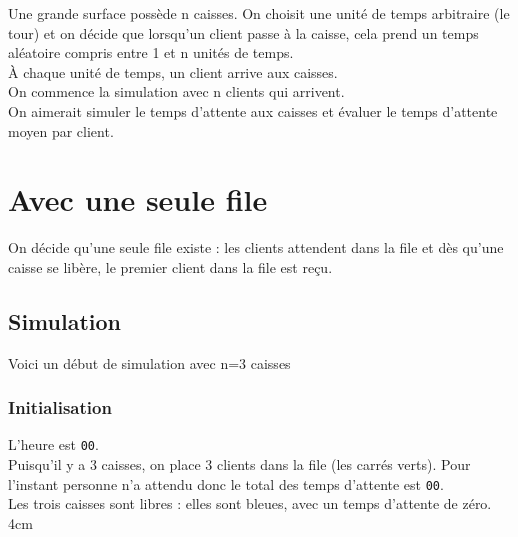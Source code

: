 \documentclass[a4paper,12pt,french]{book}
\begin{document}



Une grande surface possède n caisses. On choisit une unité de temps arbitraire (le tour) et on décide que lorsqu'un client passe à la caisse, cela prend un temps aléatoire compris entre 1 et n unités de temps.\\
À chaque unité de temps, un client arrive aux caisses.\\
On commence la simulation avec n clients qui arrivent.\\
On aimerait simuler le temps d'attente aux caisses et évaluer le temps d'attente moyen par client.\\


\section*{Avec une seule file}

On décide qu'une seule file existe : les clients attendent dans la file et dès qu'une caisse se libère, le premier client dans la file est reçu.

\subsection*{Simulation}
 Voici un début de simulation avec n=3 caisses
\subsubsection*{Initialisation}
\double
{
L'heure est \texttt{00}.\\
Puisqu'il y a 3 caisses, on place 3 clients dans la file (les carrés verts).
Pour l'instant personne n'a attendu donc le total des temps d'attente est \texttt{00}.\\
Les trois caisses sont libres : elles sont bleues, avec un temps d'attente de zéro.
}
{
}{4cm}
\end{document}
